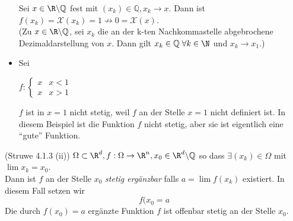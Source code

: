\begin{itemize}
Sei $x\in\R\backslash\mathbb{Q}$ fest mit $(x_{k})\in\mathbb{Q}, x_{k}\to x$. Dann ist ${f(x_{k})=\mathcal{X}(x_{k})=1 \nrightarrow 0=\mathcal{X}(x)}$. \\
(Zu $x\in\R\backslash\mathbb{Q}$, sei $x_{k}$ die an der k-ten Nachkommastelle abgebrochene Dezimaldarstellung von $x$. Dann gilt $x_{k} \in \mathbb{Q}\; \forall k \in \N$ und $x_{k}\to x_{1}$.)
\item Sei 
\begin{multicols}{2}
\begin{center}
\vspace*{\fill}
$f: \begin{cases} x &x < 1 \\x &x>1 \end{cases}$
\vspace*{\fill}
\end{center}
\columnbreak
\begin{center}
\end{center}
\end{multicols}

 $f$ ist in $x=1$ nicht stetig, weil $f$ an der Stelle $x=1$ nicht definiert ist. In diesem Beispiel ist die Funktion $f$ nicht stetig, aber sie ist eigentlich eine ``gute'' Funktion.

\end{itemize}
\begin{definition}{(Struwe 4.1.3 (ii))}
$\Omega \subset \R^{d}, f:\Omega\to\R^{n}, x_{0}\in\R^{d}\backslash\mathbb{Q}$ so dass $\exists (x_{k})\in\Omega$ mit $\lim{x_{k}=x_{0}}$. \\

Dann ist $f$ an der Stelle $x_{0}$ \emph{stetig ergänzbar} falls $a=\lim{f(x_{k})}$ existiert. In diesem Fall setzen wir \[ f(x_{0} = a\]
Die durch $f(x_{0})=a$ ergänzte Funktion $f$ ist offenbar stetig an der Stelle $x_{0}$.
\end{definition}

